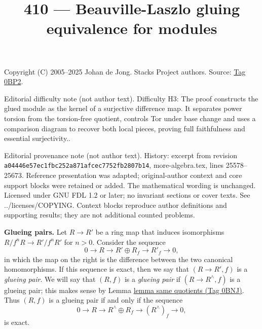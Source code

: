\documentclass{amsart}
\theoremstyle{plain}
\theoremstyle{definition}
\theoremstyle{remark}
\numberwithin{equation}{subsection}
\begin{document}
\title[Stacks Project, Tag 0BP2]{410 --- Beauville-Laszlo gluing equivalence for modules}
\maketitle
\noindent Copyright (C) 2005--2025 Johan de Jong. Stacks Project authors. Source: \href{https://stacks.math.columbia.edu/tag/0BP2}{Tag 0BP2}.

\noindent Editorial difficulty note (not author text). Difficulty H3: The proof constructs the glued module as the kernel of a surjective difference map. It separates power torsion from the torsion-free quotient, controls Tor under base change and uses a comparison diagram to recover both local pieces, proving full faithfulness and essential surjectivity..

\noindent Editorial provenance note (not author text). History: excerpt from revision \texttt{a0444\allowbreak 6e57e\allowbreak c1fbc\allowbreak 252a8\allowbreak 71afc\allowbreak ec775\allowbreak 2fb28\allowbreak 07b14}, more-algebra.tex, lines 25578--25673. Reference presentation was adapted; original-author context and core support blocks were retained or added. The mathematical wording is unchanged. Licensed under GNU FDL 1.2 or later; no invariant sections or cover texts. See ../licenses/COPYING. Context blocks reproduce author definitions and supporting results; they are not additional counted problems.

{\bf Glueing pairs.} Let $R \to R'$ be a ring map that induces isomorphisms
$R/f^nR \to R'/f^nR'$ for $n > 0$. Consider the sequence
\begin{equation}
\label{equation-BL-cech-re}
0 \to R \to R' \oplus R_f \to R'_f \to 0,
\end{equation}
in which the map on the right is the difference between the two canonical
homomorphisms. If this sequence is exact, then
we say that $(R \to R', f)$ is a \emph{glueing pair}.
We will say that $(R, f)$ is a \emph{glueing pair} if
$(R \to R^\wedge, f)$ is a glueing pair; this makes sense by
Lemma \href{https://stacks.math.columbia.edu/tag/0BNJ}{lemma same quotients (Tag 0BNJ)}. Thus $(R, f)$
is a glueing pair if and only if the sequence
\begin{equation}
\label{equation-BL-cech}
0 \to R \to R^\wedge \oplus R_f \to (R^\wedge)_f \to 0,
\end{equation}
is exact.
\end{document}
